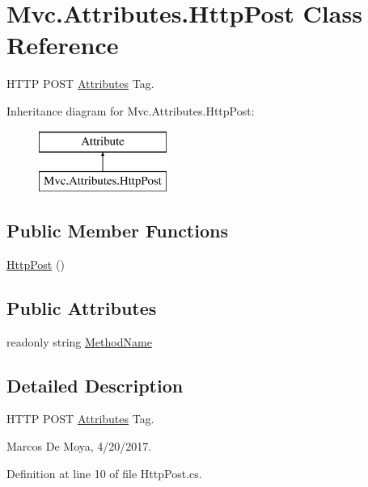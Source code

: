 \hypertarget{class_mvc_1_1_attributes_1_1_http_post}{}\section{Mvc.\+Attributes.\+Http\+Post Class Reference}
\label{class_mvc_1_1_attributes_1_1_http_post}


H\+T\+TP P\+O\+ST \hyperlink{namespace_mvc_1_1_attributes}{Attributes} Tag.  


Inheritance diagram for Mvc.\+Attributes.\+Http\+Post\+:\begin{figure}[H]
\begin{center}
\leavevmode
\includegraphics[height=2.000000cm]{class_mvc_1_1_attributes_1_1_http_post}
\end{center}
\end{figure}
\subsection*{Public Member Functions}
\begin{DoxyCompactItemize}
\item 
\hyperlink{class_mvc_1_1_attributes_1_1_http_post_ab8f658703adddc573b72a6853d2697bb}{Http\+Post} ()
\end{DoxyCompactItemize}
\subsection*{Public Attributes}
\begin{DoxyCompactItemize}
\item 
readonly string \hyperlink{class_mvc_1_1_attributes_1_1_http_post_aafe3fce3ed15c906b048a73978706926}{Method\+Name}
\end{DoxyCompactItemize}


\subsection{Detailed Description}
H\+T\+TP P\+O\+ST \hyperlink{namespace_mvc_1_1_attributes}{Attributes} Tag. 

Marcos De Moya, 4/20/2017. 

Definition at line 10 of file Http\+Post.\+cs.



